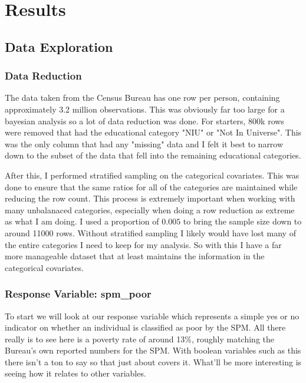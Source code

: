 \section*{Results}

\subsection*{Data Exploration}

\subsubsection*{Data Reduction}

The data taken from the Census Bureau has one row per person, containing approximately 3.2 million observations. This was obviously far too large for a bayesian analysis so a lot of data reduction was done. For starters, 800k rows were removed that had the educational category "NIU" or "Not In Universe". This was the only column that had any "missing" data and I felt it best to narrow down to the subset of the data that fell into the remaining educational categories. 

After this, I performed stratified sampling on the categorical covariates. This was done to ensure that the same ratios for all of the categories are maintained while reducing the row count. This process is extremely important when working with many unbalanaced categories, especially when doing a row reduction as extreme as what I am doing. I used a proportion of $0.005$ to bring the sample size down to around 11000 rows. Without stratified sampling I likely would have lost many of the entire categories I need to keep for my analysis. So with this I have a far more manageable dataset that at least maintains the information in the categorical covariates.



\subsubsection*{Response Variable: spm\_poor}

To start we will look at our response variable which represents a simple yes or no indicator on whether an individual is classified as poor by the SPM. All there really is to see here is a poverty rate of around 13\%, roughly matching the Bureau's own reported numbers for the SPM. With boolean variables such as this there isn't a ton to say so that just about covers it. What'll be more interesting is seeing how it relates to other variables.

